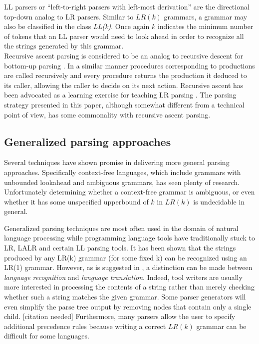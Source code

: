 \documentclass[a4paper,11pt]{article}
\begin{document}
LL parsers or ``left-to-right parsers with left-most derivation'' are the directional top-down analog to LR parsers.
Similar to $LR(k)$ grammars, a grammar may also be classified in the class \emph{LL(k)}.
Once again $k$ indicates the minimum number of tokens that an LL parser would need to look ahead in order to recognize all the strings generated by this grammar.\\

Recursive ascent parsing is considered to be an analog to recursive descent for bottom-up parsing \cite{47909}.
In a similar manner procedures corresponding to productions are called recursively and every procedure returns the production it deduced to its caller, allowing the caller to decide on its next action.
Recursive ascent has been advocated as a learning exercise for teaching LR parsing \cite{770849}.
The parsing strategy presented in this paper, although somewhat different from a technical point of view, has some commonality with recursive ascent parsing.

\subsection{Generalized parsing approaches}

Several techniques have shown promise in delivering more general parsing approaches.
Specifically context-free languages, which include grammars with unbounded lookahead and ambiguous grammars, has seen plenty of research.
Unfortunately determining whether a context-free grammar is ambiguous, or even whether it has some unspecified upperbound of $k$ in $LR(k)$ is undecidable in general\cite{knuth65}.

Generalized parsing techniques are most often used in the domain of natural language processing while programming language tools have traditionally stuck to LR, LALR and certain LL parsing tools.
It has been shown that the strings produced by any LR(k) grammar (for some fixed k) can be recognized using an LR(1) grammar\cite{knuth65}.
However, as is suggested in \cite{Parr95lland}, a distinction can be made between \emph{language recognition} and \emph{language translation}.
Indeed, tool writers are usually more interested in processing the contents of a string rather than merely checking whether such a string matches the given grammar.
Some parser generators will even simplify the parse tree output by removing nodes that contain only a single child. [citation needed]
Furthermore, many parsers allow the user to specify additional precedence rules because writing a correct $LR(k)$ grammar can be difficult for some languages.
\end{document}
